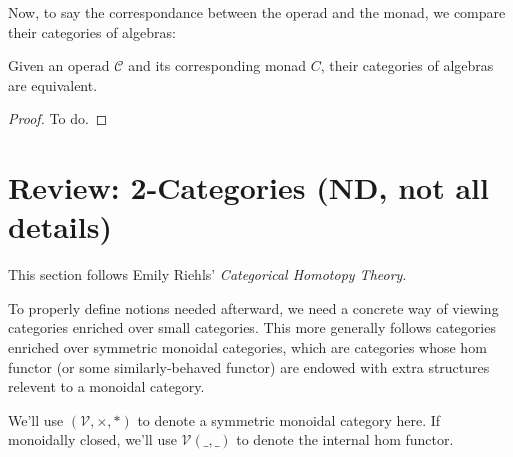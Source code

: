 \documentclass{article}
\begin{document}
\hfil

Now, to say the correspondance between the operad and the monad, we compare their categories of algebras:
\begin{thm}
Given an operad $\mathcal{C}$ and its corresponding monad $C$, their categories of algebras are equivalent.
\end{thm}

\begin{proof}
    To do.
\end{proof}


\newpage

\section{Review: 2-Categories (ND, not all details)}

This section follows Emily Riehls' \emph{Categorical Homotopy Theory}.

To properly define notions needed afterward, we need a concrete way of viewing categories enriched over small categories. This more generally follows categories enriched over symmetric monoidal categories, which are categories whose hom functor (or some similarly-behaved functor) are endowed with extra structures relevent to a monoidal category.

\begin{notn}
We'll use $(\mathcal{V},\times,*)$ to denote a symmetric monoidal category here. If monoidally closed, we'll use $\mathcal{V}(\_,\_)$ to denote the internal hom functor. 
\end{notn}
\end{document}

